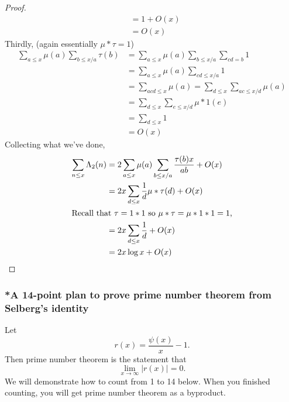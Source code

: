 \documentclass[a4paper]{article}
\theoremstyle{definition}
\begin{document}
\begin{proof}
\begin{align*}
    &= 1 + O(x) \\
    &= O(x)
  \end{align*}
  Thirdly, (again essentially \(\mu * \tau = 1\))
  \begin{align*}
    \sum_{a \leq x} \mu(a) \sum_{b \leq x/a} \tau(b)
    &= \sum_{a \leq x} \mu(a) \sum_{b \leq x/a}\sum_{cd = b} 1 \\
    &= \sum_{a \leq x} \mu(a) \sum_{cd \leq x/a} 1 \\
    &= \sum_{acd \leq x} \mu(a)
    = \sum_{d \leq x} \sum_{ac \leq x/d} \mu(a) \\
    &= \sum_{d \leq x} \sum_{e \leq x/d} \mu * 1(e) \\
    &= \sum_{d \leq x} 1 \\
    &= O(x)
  \end{align*}
  Collecting what we've done,
  \begin{align*}
    \sum_{n \leq x} \Lambda_2(n)
    &= 2 \sum_{a \leq x} \mu(a) \sum_{b \leq x/a} \frac{\tau(b) x}{ab} + O(x) \\
    &= 2x \sum_{d \leq x} \frac{1}{d} \mu * \tau(d) + O(x) \\
    \intertext{Recall that \(\tau = 1 * 1\) so \(\mu * \tau = \mu * 1 * 1 = 1\),}
    &= 2x \sum_{d \leq x} \frac{1}{d} + O(x) \\
    &= 2x \log x + O(x)
  \end{align*}
\end{proof}

\subsubsection{*A 14-point plan to prove prime number theorem from Selberg's identity}

Let
\[
  r(x) = \frac{\psi(x)}{x} - 1.
\]
Then prime number theorem is the statement that
\[
  \lim_{x \to \infty} |r(x)| = 0.
\]
We will demonstrate how to count from 1 to 14 below. When you finished counting, you will get prime number theorem as a byproduct.
\end{document}
